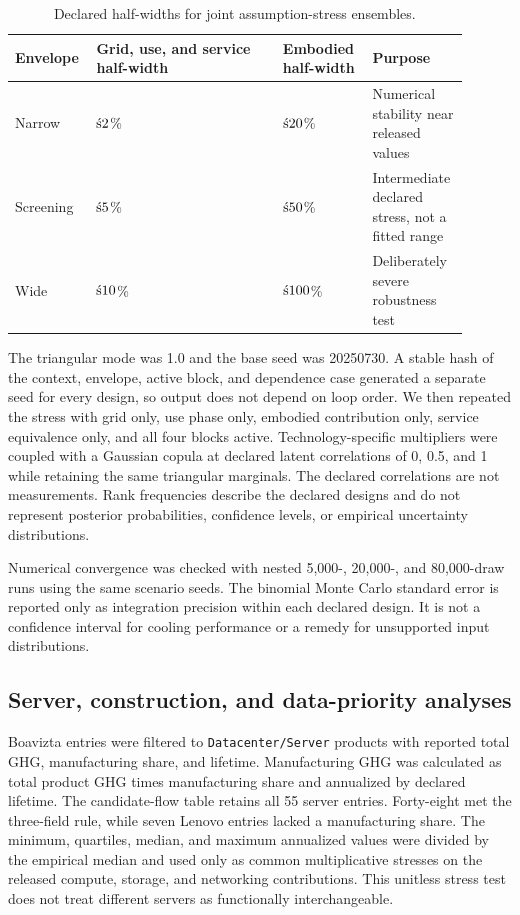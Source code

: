 \documentclass[review,a4paper,fleqn]{cas-sc}
\newcommand{\mplusminus}{\mathbin{\text{\char"00B1}}}
\begin{document}
\begin{table}
\centering
\caption{Declared half-widths for joint assumption-stress ensembles.}
\small
\setlength{\tabcolsep}{3pt}
\begin{tabularx}{\textwidth}{>{\raggedright\arraybackslash}p{0.15\linewidth}>{\raggedright\arraybackslash}p{0.39\linewidth}>{\raggedright\arraybackslash}p{0.18\linewidth}>{\raggedright\arraybackslash}p{0.18\linewidth}}
\toprule
Envelope & Grid, use, and service half-\allowbreak{}width & Embodied half-\allowbreak{}width & Purpose \\
\midrule
Narrow & $\mplusminus2$\% & $\mplusminus20$\% & Numerical stability near released values \\
Screening & $\mplusminus5$\% & $\mplusminus50$\% & Intermediate declared stress, not a fitted range \\
Wide & $\mplusminus10$\% & $\mplusminus100$\% & Deliberately severe robustness test \\
\bottomrule
\end{tabularx}
\end{table}

The triangular mode was 1.0 and the base seed was 20250730. A stable hash of the context, envelope, active block, and dependence case generated a separate seed for every design, so output does not depend on loop order. We then repeated the stress with grid only, use phase only, embodied contribution only, service equivalence only, and all four blocks active. Technology-specific multipliers were coupled with a Gaussian copula at declared latent correlations of 0, 0.5, and 1 while retaining the same triangular marginals. The declared correlations are not measurements. Rank frequencies describe the declared designs and do not represent posterior probabilities, confidence levels, or empirical uncertainty distributions.

Numerical convergence was checked with nested 5,000-, 20,000-, and 80,000-draw runs using the same scenario seeds. The binomial Monte Carlo standard error is reported only as integration precision within each declared design. It is not a confidence interval for cooling performance or a remedy for unsupported input distributions.

\subsection{Server, construction, and data-priority analyses}
Boavizta entries were filtered to \texttt{Datacenter/Server} products with reported total GHG, manufacturing share, and lifetime. Manufacturing GHG was calculated as total product GHG times manufacturing share and annualized by declared lifetime. The candidate-flow table retains all 55 server entries. Forty-eight met the three-field rule, while seven Lenovo entries lacked a manufacturing share. The minimum, quartiles, median, and maximum annualized values were divided by the empirical median and used only as common multiplicative stresses on the released compute, storage, and networking contributions. This unitless stress test does not treat different servers as functionally interchangeable.
\end{document}
